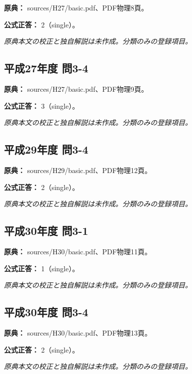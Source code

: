 \noindent\textbf{原典：} sources/H27/basic.pdf、PDF物理8頁。

\textbf{公式正答：} 2（single）。

\par\textit{原典本文の校正と独自解説は未作成。分類のみの登録項目。}

\subsection{平成27年度 問3-4}
\label{q:h27-reg-basic-3-4}

\noindent\textbf{原典：} sources/H27/basic.pdf、PDF物理9頁。

\textbf{公式正答：} 3（single）。

\par\textit{原典本文の校正と独自解説は未作成。分類のみの登録項目。}

\subsection{平成29年度 問3-4}
\label{q:h29-reg-basic-3-4}

\noindent\textbf{原典：} sources/H29/basic.pdf、PDF物理12頁。

\textbf{公式正答：} 2（single）。

\par\textit{原典本文の校正と独自解説は未作成。分類のみの登録項目。}

\subsection{平成30年度 問3-1}
\label{q:h30-reg-basic-3-1}

\noindent\textbf{原典：} sources/H30/basic.pdf、PDF物理11頁。

\textbf{公式正答：} 1（single）。

\par\textit{原典本文の校正と独自解説は未作成。分類のみの登録項目。}

\subsection{平成30年度 問3-4}
\label{q:h30-reg-basic-3-4}

\noindent\textbf{原典：} sources/H30/basic.pdf、PDF物理13頁。

\textbf{公式正答：} 2（single）。

\par\textit{原典本文の校正と独自解説は未作成。分類のみの登録項目。}

